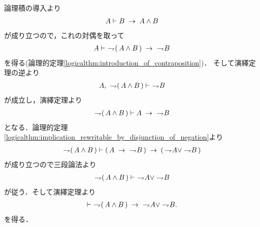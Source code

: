 	\begin{prf}
		論理積の導入より
		\begin{align}
			A \vdash B \rarrow A \wedge B
		\end{align}
		が成り立つので，これの対偶を取って
		\begin{align}
			A \vdash\ \negation (\, A \wedge B\, ) \rarrow\ \negation B
		\end{align}
		を得る(論理的定理\ref{logicalthm:introduction_of_contraposition})．
		そして演繹定理の逆より
		\begin{align}
			A,\ \negation (\, A \wedge B\, ) \vdash\ \negation B
		\end{align}
		が成立し，演繹定理より
		\begin{align}
			\negation (\, A \wedge B\, ) \vdash A \rarrow\ \negation B
		\end{align}
		となる．論理的定理\ref{logicalthm:implication_rewritable_by_disjunction_of_negation}より
		\begin{align}
			\negation (\, A \wedge B\, ) \vdash (\, A \rarrow\ \negation B\, )
			\rarrow (\, \negation A \vee \negation B\, )
		\end{align}
		が成り立つので三段論法より
		\begin{align}
			\negation (\, A \wedge B\, ) \vdash\ \negation A \vee \negation B
		\end{align}
		が従う．そして演繹定理より
		\begin{align}
			\vdash\ \negation (\, A \wedge B\, )
			\rarrow\ \negation A \vee \negation B.
		\end{align}
		を得る．
		\QED
	\end{prf}